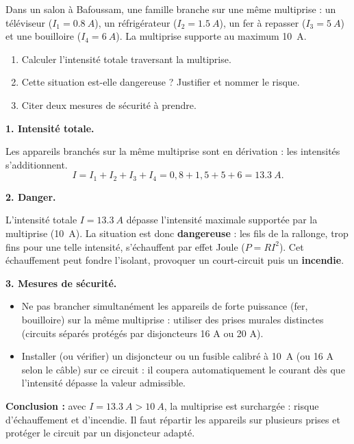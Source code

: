 \documentclass[11pt]{article}
\newcommand{\cle}[1]{{\popxbold\color{popdark}#1}}
\newcounter{popsec}
\newcounter{popsub}
\newcommand{\courssub}[1]{%
  \stepcounter{popsub}%
  \par\vspace{9pt}\noindent{\popxbold\fontsize{11.5}{13}\selectfont\color{popink}{\color{poporange}\thepopsec.\thepopsub}\hspace{6pt}#1}\par\nopagebreak\vspace{4pt}
}
\begin{document}
\begin{exoresolu}
Dans un salon à Bafoussam, une famille branche sur une même multiprise : un téléviseur ($I_1 = \SI{0,8}{A}$), un réfrigérateur ($I_2 = \SI{1,5}{A}$), un fer à repasser ($I_3 = \SI{5}{A}$) et une bouilloire ($I_4 = \SI{6}{A}$). La multiprise supporte au maximum \SI{10}{A}.
\begin{enumerate}
\item Calculer l'intensité totale traversant la multiprise.
\item Cette situation est-elle dangereuse ? Justifier et nommer le risque.
\item Citer deux mesures de sécurité à prendre.
\end{enumerate}
\tcblower
\textbf{1. Intensité totale.}

Les appareils branchés sur la même multiprise sont en dérivation : les intensités s'additionnent.
\[ I = I_1 + I_2 + I_3 + I_4 = 0{,}8 + 1{,}5 + 5 + 6 = \SI{13,3}{A}. \]

\textbf{2. Danger.}

L'intensité totale $I = \SI{13,3}{A}$ dépasse l'intensité maximale supportée par la multiprise (\SI{10}{A}). La situation est donc \textbf{dangereuse} : les fils de la rallonge, trop fins pour une telle intensité, s'échauffent par \cle{effet Joule} ($P = R I^2$). Cet échauffement peut fondre l'isolant, provoquer un court-circuit puis un \textbf{incendie}.

\textbf{3. Mesures de sécurité.}
\begin{itemize}
\item Ne pas brancher simultanément les appareils de forte puissance (fer, bouilloire) sur la même multiprise : utiliser des prises murales distinctes (circuits séparés protégés par disjoncteurs 16 A ou 20 A).
\item Installer (ou vérifier) un \cle{disjoncteur} ou un \cle{fusible} calibré à \SI{10}{A} (ou 16 A selon le câble) sur ce circuit : il coupera automatiquement le courant dès que l'intensité dépasse la valeur admissible.
\end{itemize}

\textbf{Conclusion :} avec $I = \SI{13,3}{A} > \SI{10}{A}$, la multiprise est surchargée : risque d'échauffement et d'incendie. Il faut répartir les appareils sur plusieurs prises et protéger le circuit par un disjoncteur adapté.
\end{exoresolu}

\courssub{Erreurs à éviter au BEPC}
\end{document}
